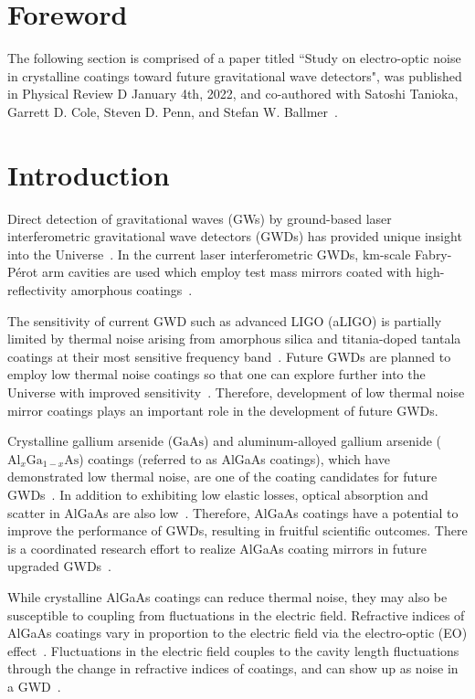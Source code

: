 \section{Foreword}
The following section is comprised of a paper titled ``Study on electro-optic noise in crystalline coatings toward future gravitational wave detectors", was published in Physical Review D January 4th, 2022, and co-authored with Satoshi Tanioka, Garrett D. Cole, Steven D. Penn, and Stefan W. Ballmer~\cite{tanioka:2022}.

\section{Introduction}
Direct detection of gravitational waves (GWs) by ground-based laser interferometric gravitational wave detectors (GWDs) has provided unique insight into the Universe~\cite{Abbott2016, gw170817, Abbott2021}.
In the current laser interferometric GWDs, km-scale Fabry-P\'erot arm cavities are used which employ test mass mirrors coated with high-reflectivity amorphous coatings~\cite{Degallaix2019, Granata2020}.

The sensitivity of current GWD such as advanced LIGO (aLIGO) is partially limited by thermal noise arising from amorphous silica and titania-doped tantala coatings at their most sensitive frequency band~\cite{harry:2006, Gras2018}.
Future GWDs are planned to employ low thermal noise coatings so that one can explore further into the Universe with improved sensitivity~\cite{Punturo_2010, Adhikari2020, CEHS, Srivastava2022}.
Therefore, development of low thermal noise mirror coatings plays an important role in the development of future GWDs.

Crystalline gallium arsenide ($\mathrm{GaAs}$) and aluminum-alloyed gallium arsenide ($\mathrm{Al}_{x}\mathrm{Ga}_{1-x}\mathrm{As}$) coatings (referred to as AlGaAs coatings), which have demonstrated low thermal noise, are one of the coating candidates for future GWDs~\cite{cole:2013, Penn2019}.
In addition to exhibiting low elastic losses, optical absorption and scatter in AlGaAs are also low~\cite{cole:2016, Winkler2021}.
Therefore, AlGaAs coatings have a potential to improve the performance of GWDs, resulting in fruitful scientific outcomes.
There is a coordinated research effort to realize AlGaAs coating mirrors in future upgraded GWDs~\cite{Chalermsongsak2016, Marchio:2018, Koch2019}.

While crystalline AlGaAs coatings can reduce thermal noise, they may also be susceptible to coupling from fluctuations in the electric field.
Refractive indices of AlGaAs coatings vary in proportion to the electric field via the electro-optic (EO) effect~\cite{Namba1961, yariv}.
Fluctuations in the electric field couples to the cavity length fluctuations through the change in refractive indices of coatings, and can show up as noise in a GWD~\cite{Abernathy, bonillafejer}.

